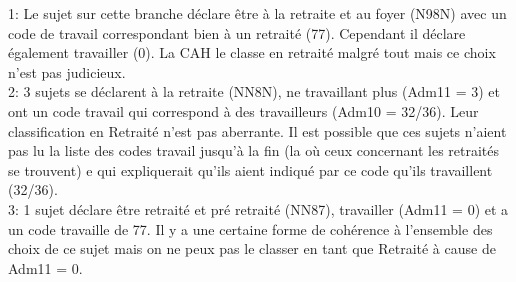 \documentclass{book}
\begin{document}
1: Le sujet sur cette branche déclare être à la retraite et au foyer (N98N) avec un code de travail correspondant bien à un retraité (77). Cependant il déclare également travailler (0). La CAH le classe en retraité malgré tout mais ce choix n'est pas judicieux.\\
2: 3 sujets se déclarent à la retraite (NN8N), ne travaillant plus (Adm11 = 3) et ont un code travail qui correspond à des travailleurs (Adm10 = 32/36). Leur classification en Retraité n'est pas aberrante. Il est possible que ces sujets n'aient pas lu la liste des codes travail jusqu'à la fin (la où ceux concernant les retraités se trouvent) e qui expliquerait qu'ils aient indiqué par ce code qu'ils travaillent (32/36).\\
3: 1 sujet déclare être retraité et pré retraité (NN87), travailler (Adm11 = 0) et a un code travaille de 77. Il y a une certaine forme de cohérence à l'ensemble des choix de ce sujet mais on ne peux pas le classer en tant que Retraité à cause de Adm11 = 0. 
\end{document}
